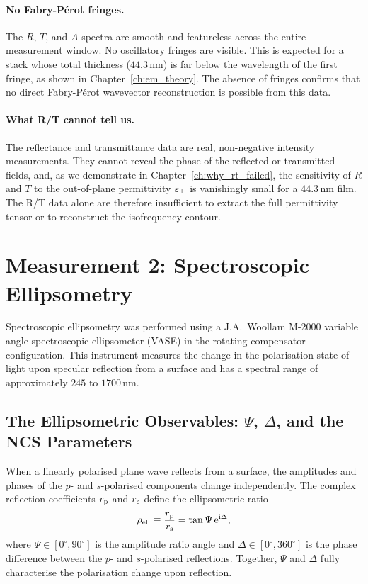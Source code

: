 \paragraph{No Fabry-P\'{e}rot fringes.}
The $R$, $T$, and $A$ spectra are smooth and featureless across the entire
measurement window. No oscillatory fringes are visible. This is expected for
a stack whose total thickness ($44.3$\,nm) is far below the wavelength of
the first fringe, as shown in Chapter~\ref{ch:em_theory}. The absence of
fringes confirms that no direct Fabry-P\'{e}rot wavevector reconstruction
is possible from this data.

\paragraph{What R/T cannot tell us.}
The reflectance and transmittance data are real, non-negative intensity
measurements. They cannot reveal the phase of the reflected or transmitted
fields, and, as we demonstrate in Chapter~\ref{ch:why_rt_failed}, the
sensitivity of $R$ and $T$ to the out-of-plane permittivity $\varepsilon_{\perp}$ is
vanishingly small for a $44.3$\,nm film. The R/T data alone are therefore
insufficient to extract the full permittivity tensor or to reconstruct the
isofrequency contour.

\section{Measurement 2: Spectroscopic Ellipsometry}

Spectroscopic ellipsometry was performed using a J.A.\ Woollam M-2000
variable angle spectroscopic ellipsometer (VASE) in the rotating compensator
configuration. This instrument measures the change in the polarisation state
of light upon specular reflection from a surface and has a spectral range of
approximately $245$ to $1700$\,nm.

\subsection{The Ellipsometric Observables: \texorpdfstring{$\Psi$, $\Delta$,
  and the NCS Parameters}{Psi, Delta, and the NCS Parameters}}

When a linearly polarised plane wave reflects from a surface, the amplitudes
and phases of the $p$- and $s$-polarised components change independently.
The complex reflection coefficients $r_{\mathrm{p}}$ and $r_{\mathrm{s}}$ define the ellipsometric
ratio
\begin{equation}
  \rho_\text{ell} \equiv \frac{r_{\mathrm{p}}}{r_{\mathrm{s}}} = \tan\Psi\,\mathrm{e}^{\mathrm{i}\Delta},
  \label{eq:ch4_ellipsometric_ratio}
\end{equation}
where $\Psi \in [0^\circ, 90^\circ]$ is the amplitude ratio angle and
$\Delta \in [0^\circ, 360^\circ]$ is the phase difference between the
$p$- and $s$-polarised reflections. Together, $\Psi$ and $\Delta$ fully
characterise the polarisation change upon reflection.

